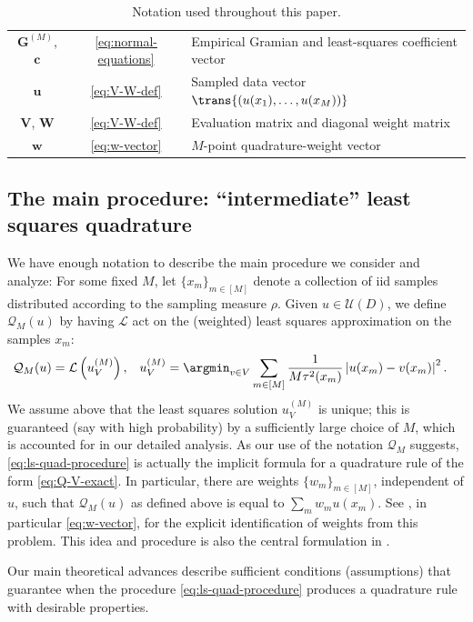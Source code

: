\documentclass[10pt,dvipsnames]{amsart}
\begin{document}
\begin{table}[t]
\begin{tabular}{@{}ccp{}@{}}
\(\mathbf G^{(M)}\), \(\mathbf c\) & \eqref{eq:normal-equations} & Empirical Gramian and least-squares coefficient vector \\
\(\mathbf u\) & \eqref{eq:V-W-def} & Sampled data vector \(\trans{(u(x_1),\ldots,u(x_M))}\) \\
\(\mathbf V\), \(\mathbf W\) & \eqref{eq:V-W-def} & Evaluation matrix and diagonal weight matrix \\
\(\mathbf w\) & \eqref{eq:w-vector} & \(M\)-point quadrature-weight vector \\
\bottomrule
\end{tabular}
\renewcommand{\arraystretch}{1}
\renewcommand{\tabcolsep}{12pt}
\caption{Notation used throughout this paper.}
\label{tab:notation}
\end{table}


\subsection{The main procedure: ``intermediate'' least squares quadrature}\label{ssec:procedure}
We have enough notation to describe the main procedure we consider and analyze: For some fixed $M$, let $\{x_m\}_{m \in [M]}$ denote a collection of iid samples distributed according to the sampling measure $\rho$. Given \(u\in\mathcal U(D)\), we define \(\mathcal Q_M(u)\) by having \(\mathcal L\) act on the (weighted) least squares approximation on the samples \(x_m\):
\begin{align}\label{eq:ls-quad-procedure}
  \mathcal{Q}_M(u) &= \mathcal{L}\left(u^{(M)}_V\right), & u^{(M)}_V &= \argmin_{v \in V} \sum_{m \in [M]} \frac{1}{M \tau^2(x_m)} \left| u(x_m) - v(x_m)\right|^2.
\end{align}
We assume above that the least squares solution $u^{(M)}_V$ is unique; this is guaranteed (say with high probability) by a sufficiently large choice of $M$, which is accounted for in our detailed analysis. As our use of the notation $\mathcal{Q}_M$ suggests, \eqref{eq:ls-quad-procedure} is actually the implicit formula for a quadrature rule of the form \eqref{eq:Q-V-exact}. In particular, there are weights $\{w_m\}_{m \in [M]}$, independent of $u$, such that $\mathcal{Q}_M(u)$ as defined above is equal to $\sum_{m} w_m u(x_m)$. See , in particular \eqref{eq:w-vector}, for the explicit identification of weights from this problem. This idea and procedure is also the central formulation in \cite{migliorati2022stable}.

Our main theoretical advances describe sufficient conditions (assumptions) that guarantee when the procedure \eqref{eq:ls-quad-procedure} produces a quadrature rule with desirable properties.  
\end{document}
